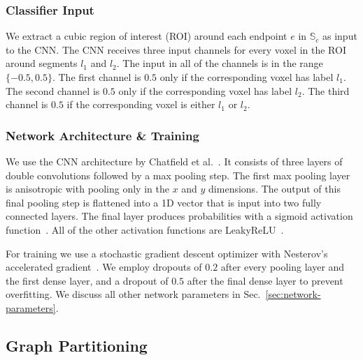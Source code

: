 \subsubsection{Classifier Input}

We extract a cubic region of interest (ROI) around each endpoint $e$ in $\mathbb{S}_c$ as input to the CNN. The CNN receives three input channels for every voxel in the ROI around segments $l_1$ and $l_2$. The input in all of the channels is in the range $\{-0.5, 0.5\}$. The first channel is $0.5$ only if the corresponding voxel has label $l_1$. The second channel is $0.5$ only if the corresponding voxel has label $l_2$. The third channel is $0.5$ if the corresponding voxel is either $l_1$ or $l_2$.

\subsubsection{Network Architecture \& Training}

We use the CNN architecture by Chatfield et al.~\cite{chatfield2014return}. It consists of three layers of double convolutions followed by a max pooling step. The first max pooling layer is anisotropic with pooling only in the $x$ and $y$ dimensions. The output of this final pooling step is flattened into a 1D vector that is input into two fully connected layers. The final layer produces probabilities with a sigmoid activation function~\cite{funahashi1989approximate}. All of the other activation functions are LeakyReLU~\cite{maas2013rectifier}.

For training we use a stochastic gradient descent optimizer with Nesterov's accelerated gradient~\cite{nesterov1983method}. We employ dropouts of $0.2$ after every pooling layer and the first dense layer, and a dropout of $0.5$ after the final dense layer to prevent overfitting. We discuss all other network parameters in Sec.~\ref{sec:network-parameters}.


\subsection{Graph Partitioning}

